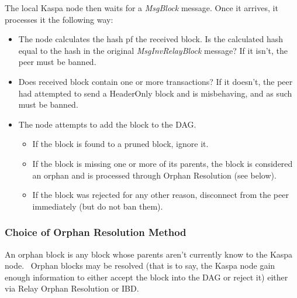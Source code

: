 The local Kaspa node then waits for a \textit{MsgBlock} message. Once it arrives, it processes it the following way:
\begin{itemize}
    \item The node calculates the hash pf the received block. Is the calculated hash equal to the hash in the original \textit{MsgInvRelayBlock} message? If it isn't, the peer must be banned.
    \item Does received block contain one or more transactions? If it doesn't, the peer had attempted to send a HeaderOnly block and is misbehaving, and as such must be banned.
    \item The node attempts to add the block to the DAG.
    \begin{itemize}
        \item If the block is found to a pruned block, ignore it.
        \item If the block is missing one or more of its parents, the block is considered an orphan and is processed through Orphan Resolution (see below).
        \item If the block was rejected for any other reason, disconnect from the peer immediately (but do not ban them).
    \end{itemize}
\end{itemize}


\subsubsection{Choice of Orphan Resolution Method}
\label{part2:kaspad:p2p:block_relay:orphan_resolution}

An orphan block is any block whose parents aren't currently know to the Kaspa node. \
Orphan blocks may be resolved (that is to say, the Kaspa node gain enough information to either accept the block into the DAG or reject it) either via Relay Orphan Resolution or IBD.

